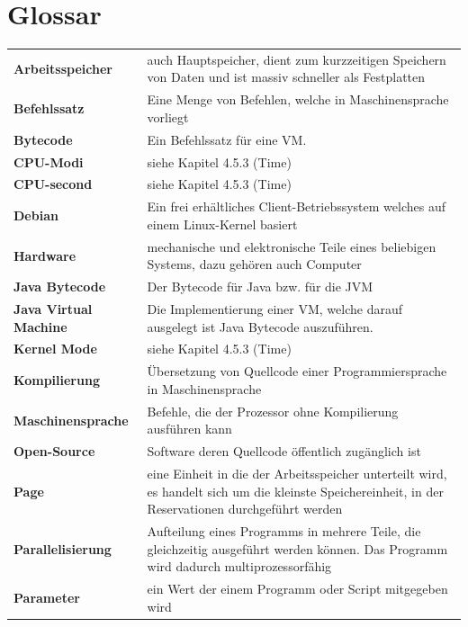 \documentclass{fancydocument}
\begin{document}
\section{Glossar}
\renewcommand{\arraystretch}{1.4}
\begin{tabularx}{\linewidth}{p{6.5cm}X}
\textbf{Arbeitsspeicher}&auch Hauptspeicher, dient zum kurzzeitigen Speichern von Daten und ist massiv schneller als Festplatten\\
\textbf{Befehlssatz}&Eine Menge von Befehlen, welche in Maschinensprache vorliegt\\
\textbf{Bytecode}&Ein Befehlssatz für eine VM.\\
\textbf{CPU-Modi}&siehe Kapitel 4.5.3 (Time)\\
\textbf{CPU-second}&siehe Kapitel 4.5.3 (Time)\\
\textbf{Debian}&Ein frei erhältliches Client-Betriebssystem welches auf einem Linux-Kernel basiert\\
\textbf{Hardware}&mechanische und elektronische Teile eines beliebigen Systems, dazu gehören auch Computer\\
\textbf{Java Bytecode}&Der Bytecode für Java bzw. für die JVM\\
\textbf{Java Virtual Machine}&Die Implementierung einer VM, welche darauf ausgelegt ist Java Bytecode auszuführen.\\
\textbf{Kernel Mode}&siehe Kapitel 4.5.3 (Time)\\
\textbf{Kompilierung}&Übersetzung von Quellcode einer Programmiersprache in Maschinensprache\\
\textbf{Maschinensprache}&Befehle, die der Prozessor ohne Kompilierung ausführen kann\\
\textbf{Open-Source}&Software deren Quellcode öffentlich zugänglich ist\\
\textbf{Page}&eine Einheit in die der Arbeitsspeicher unterteilt wird, es handelt sich um die kleinste Speichereinheit, in der Reservationen durchgeführt werden\\
\textbf{Parallelisierung}&Aufteilung eines Programms in mehrere Teile, die gleichzeitig ausgeführt werden können. Das Programm wird dadurch multiprozessorfähig\\
\textbf{Parameter}&ein Wert der einem Programm oder Script mitgegeben wird\\
\end{tabularx}
\newpage
\noindent
\end{document}
